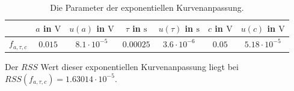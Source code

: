 \documentclass[../../main.tex]{subfiles}
\begin{document}
    \begin{table}[H]
        \centering
        \begin{tabular}{c|cc|cc|cc}
            \hline
             & $a$ in $\si{\volt}$ & $u(a)$ in $\si{\volt}$ & $\tau$ in $\si{\s}$ & $u(\tau)$ in $\si{\s}$ & $c$ in $\si{\volt}$ & $u(c)$ in $\si{\volt}$ \\
            \hline\hline
            $f_{a,\tau,c}$ & $0.015$ & $8.1\cdot 10^{-5}$ & $0.00025$ & $3.6\cdot 10^{-6}$ & $0.05$ & $5.18\cdot 10^{-5}$ \\
            \hline
        \end{tabular}
        \caption{Die Parameter der exponentiellen Kurvenanpassung.}
        \label{tab:2:spontaneEmissionDataTExpFit}
    \end{table}
    Der $RSS$ Wert dieser exponentiellen Kurvenanpassung liegt bei $RSS(f_{a,\tau,c}) = 1.63014\cdot 10^{-5}$.
\end{document}

